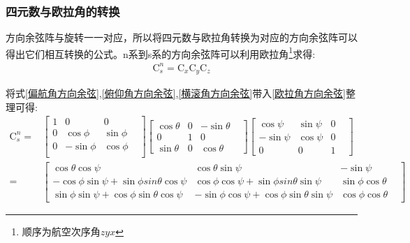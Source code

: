 \subsubsection{四元数与欧拉角的转换}\label{section:四元数与欧拉角的转换}
方向余弦阵与旋转一一对应\citep{方向余弦阵}，所以将四元数与欧拉角转换为对应的方向余弦阵可以得出它们相互转换的公式。n系到s系的方向余弦阵可以利用欧拉角\footnote{顺序为航空次序角$zyx$}\citep{捷联惯导航}求得:
\begin{equation}\label{欧拉角方向余弦}
    \begin{split} 
        \mathrm{C}^n_s=\mathrm{C}_x\mathrm{C}_y\mathrm{C}_z
    \end{split}
\end{equation} 

将式\ref{偏航角方向余弦},\ref{俯仰角方向余弦},\ref{横滚角方向余弦}带入\ref{欧拉角方向余弦}整理可得:
\begin{equation}\label{欧拉角n转s}
    \begin{split} 
        \mathrm{C}^n_s=&\left[\begin{matrix}
                1 &           0 &          0 & \\
                0 &  \cos{\phi} & \sin{\phi} & \\
                0 & -\sin{\phi} & \cos{\phi} & \\
                \end{matrix}\right]
                \left[\begin{matrix}
                \cos{\theta} & 0 & -\sin{\theta} & \\
                           0 & 1 &           0 & \\
                \sin{\theta} & 0 &  \cos{\theta} &
                \end{matrix}\right]
                \left[\begin{matrix}
                 \cos{\psi} & \sin{\psi} & 0 & \\
                -\sin{\psi} & \cos{\psi} & 0 & \\
                          0 &          0 & 1 &
                \end{matrix}\right] \\
                =&\left[\begin{matrix}
                \cos{\theta}\cos{\psi} & \cos{\theta}\sin{\psi} & -\sin{\psi} & \\
                -\cos{\phi}\sin{\psi}+\sin{\phi}sin{\theta}\cos{\psi} & \cos{\phi}\cos{\psi}+\sin{\phi}sin{\theta}\sin{\psi} & \sin{\phi}\cos{\theta} & \\
                 \sin{\phi}\sin{\psi} + \cos{\phi}\sin{\theta}\cos{\psi} & -\sin{\phi}\cos{\psi} + \cos{\phi}\sin{\theta}\sin{\psi} & \cos{\phi}\cos{\theta} &
                \end{matrix}\right]
    \end{split}
\end{equation} 

